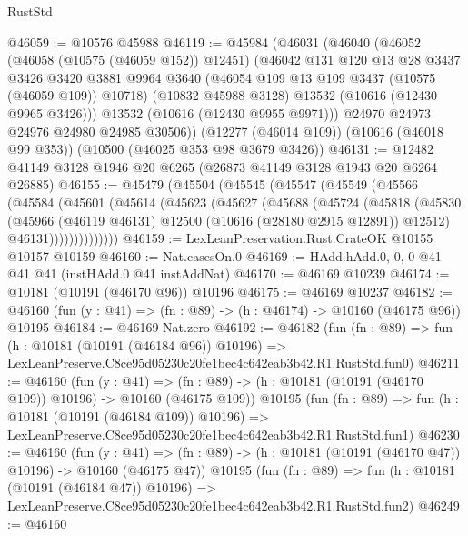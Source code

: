 \begin{lexlean}{RustStd}
\begin{coremodule}
@46059 := @10576 @45988
@46119 := @45984
    (@46031
      (@46040
        (@46052
          (@46058 (@10575 (@46059 @152)) @12451)
          (@46042
            @131
            @120
            @13
            @28
            @3437
            @3426
            @3420
            @3881
            @9964
            @3640
            (@46054 @109 @13 @109 @3437 (@10575 (@46059 @109)) @10718)
            (@10832 @45988 @3128)
            @13532
            (@10616 (@12430 @9965 @3426)))
          @13532
          (@10616 (@12430 @9955 @9971)))
        @24970
        @24973
        @24976
        @24980
        @24985
        @30506))
    (@12277 (@46014 @109))
    (@10616 (@46018 @99 @353))
    (@10500 (@46025 @353 @98 @3679 @3426))
@46131 := @12482 @41149 @3128 @1946 @20 @6265 (@26873 @41149 @3128 @1943 @20 @6264 @26885)
@46155 := @45479
    (@45504
      (@45545
        (@45547
          (@45549
            (@45566
              (@45584
                (@45601
                  (@45614
                    (@45623
                      (@45627
                        (@45688
                          (@45724
                            (@45818
                              (@45830
                                (@45966
                                  (@46119 @46131)
                                  @12500
                                  (@10616 (@28180 @2915 @12891))
                                  @12512)
                                @46131))))))))))))))
@46159 := LexLeanPreservation.Rust.CrateOK @10155 @10157 @10159
@46160 := Nat.casesOn.{0}
@46169 := HAdd.hAdd.{0, 0, 0} @41 @41 @41 (instHAdd.{0} @41 instAddNat)
@46170 := @46169 @10239
@46174 := @10181 (@10191 (@46170 @96)) @10196
@46175 := @46169 @10237
@46182 := @46160 (fun (y : @41) => (fn : @89) -> (h : @46174) -> @10160 (@46175 @96)) @10195
@46184 := @46169 Nat.zero
@46192 := @46182
    (fun (fn : @89) =>
    fun (h : @10181 (@10191 (@46184 @96)) @10196) =>
    LexLeanPreserve.C8ce95d05230c20fe1bec4c642eab3b42.R1.RustStd.fun0)
@46211 := @46160
    (fun (y : @41) =>
    (fn : @89) -> (h : @10181 (@10191 (@46170 @109)) @10196) -> @10160 (@46175 @109))
    @10195
    (fun (fn : @89) =>
    fun (h : @10181 (@10191 (@46184 @109)) @10196) =>
    LexLeanPreserve.C8ce95d05230c20fe1bec4c642eab3b42.R1.RustStd.fun1)
@46230 := @46160
    (fun (y : @41) =>
    (fn : @89) -> (h : @10181 (@10191 (@46170 @47)) @10196) -> @10160 (@46175 @47))
    @10195
    (fun (fn : @89) =>
    fun (h : @10181 (@10191 (@46184 @47)) @10196) =>
    LexLeanPreserve.C8ce95d05230c20fe1bec4c642eab3b42.R1.RustStd.fun2)
@46249 := @46160

\end{coremodule}
\end{lexlean}

